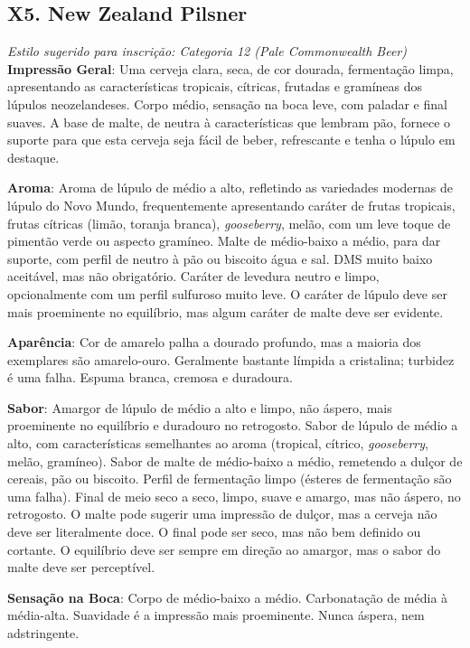 \subsection*{X5. New Zealand Pilsner}

\textit{Estilo sugerido para inscrição: Categoria 12 (Pale Commonwealth Beer)}
\textbf{Impressão Geral}: Uma cerveja clara, seca, de cor dourada, fermentação limpa, apresentando as características tropicais, cítricas, frutadas e gramíneas dos lúpulos neozelandeses. Corpo médio, sensação na boca leve, com paladar e final suaves. A base de malte, de neutra à características que lembram pão, fornece o suporte para que esta cerveja seja fácil de beber, refrescante e tenha o lúpulo em destaque.

\textbf{Aroma}: Aroma de lúpulo de médio a alto, refletindo as variedades modernas de lúpulo do Novo Mundo, frequentemente apresentando caráter de frutas tropicais, frutas cítricas (limão, toranja branca), \textit{gooseberry}, melão, com um leve toque de pimentão verde ou aspecto gramíneo. Malte de médio-baixo a médio, para dar suporte, com perfil de neutro à pão ou biscoito água e sal. DMS muito baixo aceitável, mas não obrigatório. Caráter de levedura neutro e limpo, opcionalmente com um perfil sulfuroso muito leve. O caráter de lúpulo deve ser mais proeminente no equilíbrio, mas algum caráter de malte deve ser evidente.

\textbf{Aparência}: Cor de amarelo palha a dourado profundo, mas a maioria dos exemplares são amarelo-ouro. Geralmente bastante límpida a cristalina; turbidez é uma falha. Espuma branca, cremosa e duradoura.

\textbf{Sabor}: Amargor de lúpulo de médio a alto e limpo, não áspero, mais proeminente no equilíbrio e duradouro no retrogosto. Sabor de lúpulo de médio a alto, com características semelhantes ao aroma (tropical, cítrico, \textit{gooseberry}, melão, gramíneo). Sabor de malte de médio-baixo a médio, remetendo a dulçor de cereais, pão ou biscoito. Perfil de fermentação limpo (ésteres de fermentação são uma falha). Final de meio seco a seco, limpo, suave e amargo, mas não áspero, no retrogosto. O malte pode sugerir uma impressão de dulçor, mas a cerveja não deve ser literalmente doce. O final pode ser seco, mas não bem definido ou cortante. O equilíbrio deve ser sempre em direção ao amargor, mas o sabor do malte deve ser perceptível.

\textbf{Sensação na Boca}: Corpo de médio-baixo a médio. Carbonatação de média à média-alta. Suavidade é a impressão mais proeminente. Nunca áspera, nem adstringente.

